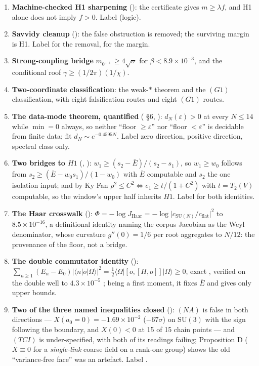 \begin{enumerate}
  \LC.
\item \textbf{Machine-checked H1 sharpening} (): the
  certificate gives $m\ge\lambda f$, and H1 alone does not imply $f>0$. Label \LT{} (logic).
\item \textbf{Savvidy cleanup} (): the false obstruction is removed; the
  surviving margin is H1. Label \LT{} for the removal, \LM{} for the margin.
\item \textbf{Strong-coupling bridge} $m_{0^{++}}\ge4\sqrt\sigma$ for
  $\beta<8.9\times10^{-3}$, and the conditional roof $\gamma\ge(1/2\pi)(1/\chi)$.
\item \textbf{Two-coordinate classification}: the weak-$*$ theorem and the $(G1)$ classification,
  with eight falsification routes and eight $(G1)$ routes.
\item \textbf{The data-mode theorem, quantified} ( \S6,
  ): $d_N(\varepsilon)>0$ at every $N\le14$ while $\min=0$ always, so
  neither ``floor $\ge\varepsilon$'' nor ``floor $<\varepsilon$'' is decidable from finite data; fit
  $d_N\sim e^{-0.4595N}$. Label \LT{} zero direction, \LE{} positive direction, spectral class only.
\item \textbf{Two bridges to $H1$} (, ):
  $w_1\ge(s_2-\bar E)/(s_2-s_1)$, so $w_1\ge w_0$ follows from $s_2\ge(\bar E-w_0s_1)/(1-w_0)$ with
  $\bar E$ computable and $s_2$ the one isolation input; and by Ky Fan
  $\rho^2\le C^2\iff e_1\ge t/(1+C^2)$ with $t=T_2(V)$ computable, so the window's upper half inherits
  $H1$. Label \LT{} for both identities.
\item \textbf{The Haar crosswalk} ():
  $\Phi=-\log J_{\mathrm{Haar}}=-\log\lvert c_{\mathrm{SU}(N)}/c_{\mathrm{flat}}\rvert^2$ to
  $8.5\times10^{-16}$, a definitional identity \LT{} naming the corpus Jacobian as the Weyl denominator,
  whose curvature $g''(0)=1/6$ per root aggregates to $N/12$: the provenance of the floor, not a bridge.
\item \textbf{The double commutator identity} ():
  $\sum_{n\ge1}(E_n-E_0)\lvert\langle n|o|\Omega\rangle\rvert^2
  =\tfrac12\langle\Omega|[o,[H,o]]|\Omega\rangle\ge0$, exact \LT{}, verified on the double well to
  $4.3\times10^{-5}$ \LE; being a first moment, it fixes $\bar E$ and gives only upper bounds.
\item \textbf{Two of the three named inequalities closed} (): $(NA)$ is false
  in both directions --- $X(a_0{=}0)=-1.69\times10^{-2}$ ($-67\sigma$) on $\mathrm{SU}(3)$ with the sign
  following the boundary, and $X(0)<0$ at 15 of 15 chain points --- and $(TCI)$ is under-specified, with
  both of its readings failing; Proposition D ($X\equiv0$ for a \emph{single-link} coarse field on a
  rank-one group) \LT{} shows the old ``variance-free face'' was an artefact. Label \LN.
\end{enumerate}

